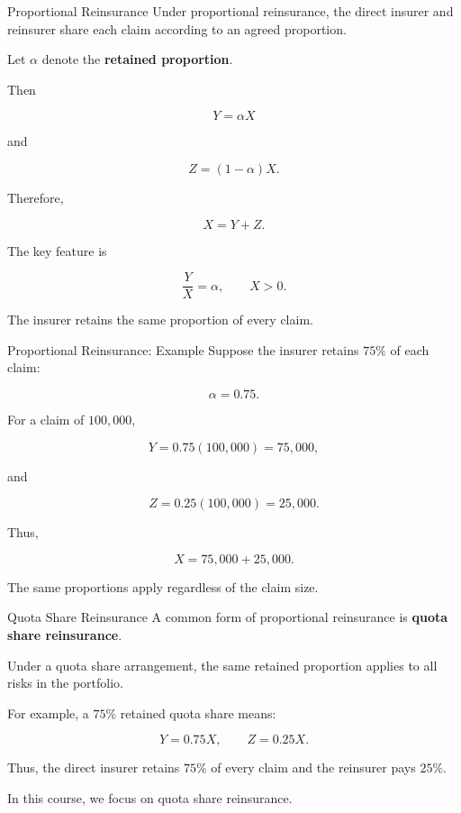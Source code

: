 \documentclass[
  ignorenonframetext,
  aspectratio=169,
]{beamer}
\begin{document}
\begin{frame}{Proportional Reinsurance}
\protect{}\label{proportional-reinsurance-1}
Under proportional reinsurance, the direct insurer and reinsurer share
each claim according to an agreed proportion.

Let \(\alpha\) denote the \textbf{retained proportion}.

Then

\[
\boxed{Y=\alpha X}
\]

and

\[
\boxed{Z=(1-\alpha)X}.
\]

Therefore,

\[
X=Y+Z.
\]

The key feature is

\[
\boxed{\frac{Y}{X}=\alpha},
\qquad X>0.
\]

The insurer retains the same proportion of every claim.
\end{frame}

\begin{frame}{Proportional Reinsurance: Example}
\protect{}\label{proportional-reinsurance-example-1}
Suppose the insurer retains \(75\%\) of each claim:

\[
\alpha=0.75.
\]

For a claim of \(100{,}000\),

\[
Y=0.75(100{,}000)=75{,}000,
\]

and

\[
Z=0.25(100{,}000)=25{,}000.
\]

Thus,

\[
X=75{,}000+25{,}000.
\]

The same proportions apply regardless of the claim size.
\end{frame}

\begin{frame}{Quota Share Reinsurance}
\protect{}\label{quota-share-reinsurance}
A common form of proportional reinsurance is \textbf{quota share
reinsurance}.

Under a quota share arrangement, the same retained proportion applies to
all risks in the portfolio.

For example, a \(75\%\) retained quota share means:

\[
Y=0.75X,
\qquad
Z=0.25X.
\]

Thus, the direct insurer retains \(75\%\) of every claim and the
reinsurer pays \(25\%\).

In this course, we focus on quota share reinsurance.
\end{frame}
\end{document}
